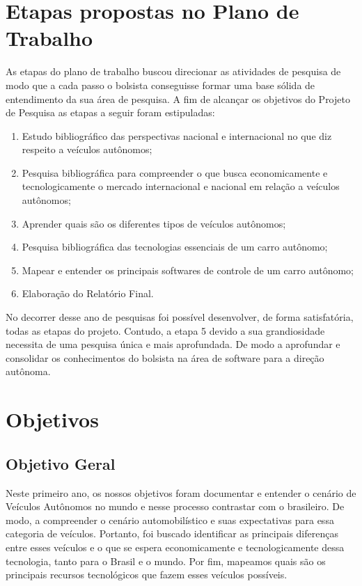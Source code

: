 
\chapter{Etapas propostas no Plano de Trabalho}
As etapas do plano de trabalho buscou direcionar as atividades de pesquisa de modo que a cada passo o bolsista conseguisse formar uma base sólida de entendimento da sua área de pesquisa. A fim de alcançar os objetivos do Projeto de Pesquisa as etapas a seguir foram estipuladas:
\begin{enumerate}
    \item  Estudo bibliográfico das perspectivas nacional e internacional no que diz respeito a veículos autônomos;
    \item  Pesquisa bibliográfica para compreender o que busca economicamente e tecnologicamente o mercado internacional e nacional em relação a veículos autônomos;
    \item Aprender quais são os diferentes tipos de veículos autônomos;
    \item Pesquisa bibliográfica das tecnologias essenciais de um carro autônomo;
    \item Mapear e entender os principais softwares de controle de um carro autônomo;
    \item Elaboração do Relatório Final.
\end{enumerate}

No decorrer desse ano de pesquisas foi possível desenvolver, de forma satisfatória, todas as etapas do projeto. Contudo, a etapa 5 devido a sua grandiosidade necessita de uma pesquisa única e mais aprofundada. De modo a aprofundar e consolidar os conhecimentos do bolsista na área de software para a direção autônoma.

\newpage
\chapter{Objetivos}\label{Objetivos}
\section{Objetivo Geral}\label{Objetivo Geral}
Neste primeiro ano, os nossos objetivos foram documentar e entender o cenário de Veículos Autônomos no mundo e nesse processo contrastar com o brasileiro. De modo, a compreender o cenário automobilístico e suas expectativas para essa categoria de veículos. Portanto, foi buscado identificar as principais diferenças entre esses veículos e o que se espera economicamente e tecnologicamente dessa tecnologia, tanto para o Brasil e o mundo. Por fim, mapeamos quais são os principais recursos tecnológicos que fazem esses veículos possíveis. 

